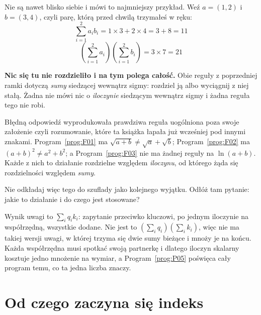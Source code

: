 \begin{fr}
Nie są nawet blisko siebie i mówi to najmniejszy przykład. Weź $a = (1, 2)$ i
$b = (3, 4)$, czyli parę, którą przed chwilą trzymałeś w ręku:
\[ \sum_{i=1}^{2} a_i b_i = 1 \times 3 + 2 \times 4 = 3 + 8 = 11 \]
\[ \left(\sum_{i=1}^{2} a_i\right)\left(\sum_{i=1}^{2} b_i\right)
   = 3 \times 7 = 21 \]

\begin{trapbox}
\textbf{Nic się tu nie rozdzieliło i na tym polega całość.} Obie reguły z
poprzedniej ramki dotyczą \emph{sumy} siedzącej wewnątrz sigmy: rozdziel ją
albo wyciągnij z niej stałą. Żadna nie mówi nic o \emph{iloczynie} siedzącym
wewnątrz sigmy i żadna reguła tego nie robi.

Błędną odpowiedź wyprodukowała prawdziwa reguła uogólniona poza swoje
założenie \dash{} czyli rozumowanie, które ta książka łapała już wcześniej pod
innymi znakami. Program~\ref{prog:F01} ma
$\sqrt{a+b} \ne \sqrt{a} + \sqrt{b}$; Program~\ref{prog:F02} ma
$(a+b)^{2} \ne a^{2} + b^{2}$; a Program~\ref{prog:F03} nie ma żadnej reguły
na $\ln(a + b)$. Każde z nich to działanie rozdzielne względem
\emph{iloczynu}, od którego żąda się rozdzielności względem \emph{sumy}.

Nie odkładaj więc tego do szuflady jako kolejnego wyjątku. Odłóż tam pytanie:
jakie to działanie i do czego jest stosowane?
\end{trapbox}

\begin{aibox}
Wynik uwagi to $\sum_i q_i k_i$: zapytanie przeciwko kluczowi, po jednym
iloczynie na współrzędną, wszystkie dodane. Nie jest to
$\left(\sum_i q_i\right)\left(\sum_i k_i\right)$, więc nie ma takiej wersji
uwagi, w której trzyma się dwie sumy bieżące i mnoży je na końcu. Każda
współrzędna musi spotkać swoją partnerkę i dlatego iloczyn skalarny kosztuje
jedno mnożenie na wymiar, a Program~\ref{prog:P05} poświęca cały program temu,
co ta jedna liczba znaczy.
\end{aibox}
\end{fr}

\section{Od czego zaczyna się indeks}
\label{sec:F04-index}


